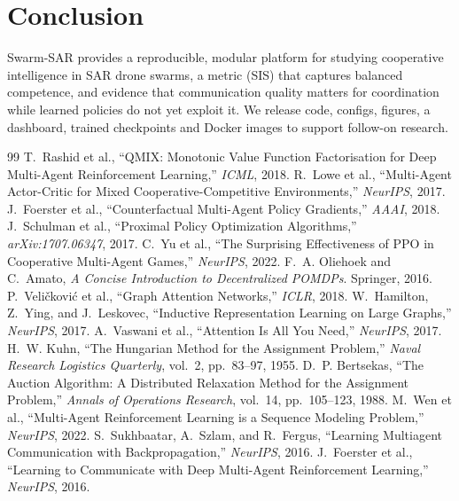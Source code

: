 \documentclass[twocolumn,10pt]{article}
\begin{document}
\section{Conclusion}
Swarm-SAR provides a reproducible, modular platform for studying cooperative
intelligence in SAR drone swarms, a metric (SIS) that captures balanced
competence, and evidence that communication quality matters for coordination while
learned policies do not yet exploit it. We release code, configs, figures, a
dashboard, trained checkpoints and Docker images to support follow-on research.

\begin{thebibliography}{99}
 T.~Rashid et al., ``QMIX: Monotonic Value Function Factorisation for Deep Multi-Agent Reinforcement Learning,'' \emph{ICML}, 2018.
 R.~Lowe et al., ``Multi-Agent Actor-Critic for Mixed Cooperative-Competitive Environments,'' \emph{NeurIPS}, 2017.
 J.~Foerster et al., ``Counterfactual Multi-Agent Policy Gradients,'' \emph{AAAI}, 2018.
 J.~Schulman et al., ``Proximal Policy Optimization Algorithms,'' \emph{arXiv:1707.06347}, 2017.
 C.~Yu et al., ``The Surprising Effectiveness of PPO in Cooperative Multi-Agent Games,'' \emph{NeurIPS}, 2022.
 F.~A. Oliehoek and C.~Amato, \emph{A Concise Introduction to Decentralized POMDPs}. Springer, 2016.
 P.~Veli\v{c}kovi\'c et al., ``Graph Attention Networks,'' \emph{ICLR}, 2018.
 W.~Hamilton, Z.~Ying, and J.~Leskovec, ``Inductive Representation Learning on Large Graphs,'' \emph{NeurIPS}, 2017.
 A.~Vaswani et al., ``Attention Is All You Need,'' \emph{NeurIPS}, 2017.
 H.~W. Kuhn, ``The Hungarian Method for the Assignment Problem,'' \emph{Naval Research Logistics Quarterly}, vol.~2, pp.~83--97, 1955.
 D.~P. Bertsekas, ``The Auction Algorithm: A Distributed Relaxation Method for the Assignment Problem,'' \emph{Annals of Operations Research}, vol.~14, pp.~105--123, 1988.
 M.~Wen et al., ``Multi-Agent Reinforcement Learning is a Sequence Modeling Problem,'' \emph{NeurIPS}, 2022.
 S.~Sukhbaatar, A.~Szlam, and R.~Fergus, ``Learning Multiagent Communication with Backpropagation,'' \emph{NeurIPS}, 2016.
 J.~Foerster et al., ``Learning to Communicate with Deep Multi-Agent Reinforcement Learning,'' \emph{NeurIPS}, 2016.

\end{thebibliography}
\end{document}
